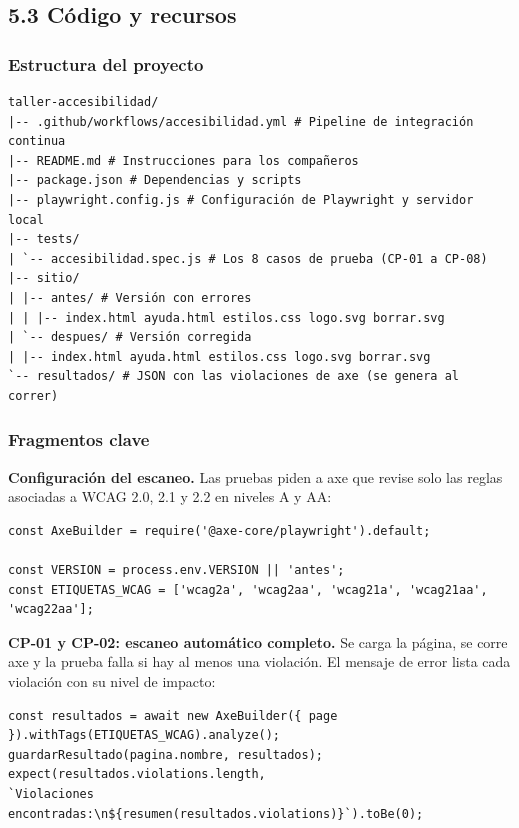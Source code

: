 \documentclass[10pt,letterpaper,onecolumn]{IEEEtran}
\begin{document}
\subsection{5.3 Código y recursos}\label{cuxf3digo-y-recursos}

\subsubsection{Estructura del proyecto}\label{estructura-del-proyecto}

\begin{lstlisting}
taller-accesibilidad/
|-- .github/workflows/accesibilidad.yml # Pipeline de integración continua
|-- README.md # Instrucciones para los compañeros
|-- package.json # Dependencias y scripts
|-- playwright.config.js # Configuración de Playwright y servidor local
|-- tests/
| `-- accesibilidad.spec.js # Los 8 casos de prueba (CP-01 a CP-08)
|-- sitio/
| |-- antes/ # Versión con errores
| | |-- index.html ayuda.html estilos.css logo.svg borrar.svg
| `-- despues/ # Versión corregida
| |-- index.html ayuda.html estilos.css logo.svg borrar.svg
`-- resultados/ # JSON con las violaciones de axe (se genera al correr)
\end{lstlisting}

\subsubsection{Fragmentos clave}\label{fragmentos-clave}

\textbf{Configuración del escaneo.} Las pruebas piden a axe que revise solo las reglas asociadas a WCAG 2.0, 2.1 y 2.2 en niveles A y AA:

\begin{lstlisting}
const AxeBuilder = require('@axe-core/playwright').default;

const VERSION = process.env.VERSION || 'antes';
const ETIQUETAS_WCAG = ['wcag2a', 'wcag2aa', 'wcag21a', 'wcag21aa', 'wcag22aa'];
\end{lstlisting}

\textbf{CP-01 y CP-02: escaneo automático completo.} Se carga la página, se corre axe y la prueba falla si hay al menos una violación. El mensaje de error lista cada violación con su nivel de impacto:

\begin{lstlisting}
const resultados = await new AxeBuilder({ page }).withTags(ETIQUETAS_WCAG).analyze();
guardarResultado(pagina.nombre, resultados);
expect(resultados.violations.length,
`Violaciones encontradas:\n${resumen(resultados.violations)}`).toBe(0);
\end{lstlisting}
\end{document}
